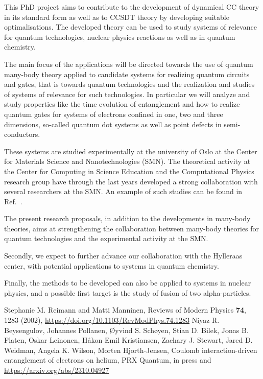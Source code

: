 \documentclass{article}
\begin{document}
This PhD project aims to contribute to the development of dynamical CC
theory in its standard form as well as to CCSDT theory by developing
suitable optimalisations. The developed theory can be used to study
systems of relevance for quantum technologies, nuclear physics
reactions as well as in quantum chemistry.

The main focus of the applications will be directed towards the use of
quantum many-body theory applied to candidate systems for realizing
quantum circuits and gates, that is towards quantum technologies and
the realization and studies of systems of relevance for such
technologies. In particular we will analyze and study properties like
the time evolution of entanglement and how to realize quantum gates
for systems of electrons confined in one, two and three dimensions,
so-called quantum dot systems \cite{Reimann2002} as well as point
defects in semi-conductors.

These systems are studied experimentally
at the university of Oslo at the Center for Materials Science and
Nanotechnologies (SMN). The theoretical activity at the Center for
Computing in Science Education and the Computational Physics research
group have through the last years developed a strong collaboration
with several researchers at the SMN. An example of such studies can be found in Ref.~\cite{us2024}.

The present research proposals, in addition to the developments in
many-body theories, aims at strengthening the collaboration between
many-body theories for quantum technologies and the experimental
activity at the SMN.


Secondly, we expect to further advance our collaboration with the
Hylleraas center, with potential applications to systems in quantum
chemistry.

Finally, the methods to be developed can also be applied to systems in
nuclear physics, and a possible first target is the study of fusion of
two alpha-particles. 


\begin{thebibliography}{99}

 Stephanie M. Reimann and Matti Manninen, Reviews of  Modern Physics {\bf 74}, 1283 (2002), \url{https://doi.org/10.1103/RevModPhys.74.1283}
 Niyaz R. Beysengulov, Johannes Pollanen, Øyvind S. Schøyen, Stian D. Bilek, Jonas B. Flaten, Oskar Leinonen, Håkon Emil Kristiansen, Zachary J. Stewart, Jared D. Weidman, Angela K. Wilson, Morten Hjorth-Jensen, Coulomb interaction-driven entanglement of electrons on helium, PRX Quantum, in press and \url{https://arxiv.org/abs/2310.04927}
\end{thebibliography}  
\end{document}
